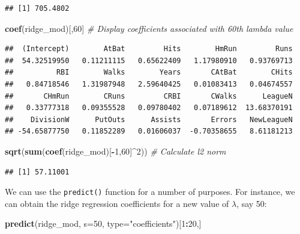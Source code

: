 \documentclass[openany]{book}
\newenvironment{Shaded}{\begin{snugshade}}{\end{snugshade}}
\newcommand{\CommentTok}[1]{\textcolor[rgb]{0.56,0.35,0.01}{\textit{#1}}}
\newcommand{\DataTypeTok}[1]{\textcolor[rgb]{0.13,0.29,0.53}{#1}}
\newcommand{\DecValTok}[1]{\textcolor[rgb]{0.00,0.00,0.81}{#1}}
\newcommand{\KeywordTok}[1]{\textcolor[rgb]{0.13,0.29,0.53}{\textbf{#1}}}
\newcommand{\NormalTok}[1]{#1}
\newcommand{\OperatorTok}[1]{\textcolor[rgb]{0.81,0.36,0.00}{\textbf{#1}}}
\newcommand{\StringTok}[1]{\textcolor[rgb]{0.31,0.60,0.02}{#1}}
\begin{document}
\begin{Shaded}
\end{Shaded}

\begin{verbatim}
## [1] 705.4802
\end{verbatim}

\begin{Shaded}
\begin{Highlighting}[]
\KeywordTok{coef}\NormalTok{(ridge_mod)[,}\DecValTok{60}\NormalTok{] }\CommentTok{# Display coefficients associated with 60th lambda value}
\end{Highlighting}
\end{Shaded}

\begin{verbatim}
##  (Intercept)        AtBat         Hits        HmRun         Runs 
##  54.32519950   0.11211115   0.65622409   1.17980910   0.93769713 
##          RBI        Walks        Years       CAtBat        CHits 
##   0.84718546   1.31987948   2.59640425   0.01083413   0.04674557 
##       CHmRun        CRuns         CRBI       CWalks      LeagueN 
##   0.33777318   0.09355528   0.09780402   0.07189612  13.68370191 
##    DivisionW      PutOuts      Assists       Errors   NewLeagueN 
## -54.65877750   0.11852289   0.01606037  -0.70358655   8.61181213
\end{verbatim}

\begin{Shaded}
\begin{Highlighting}[]
\KeywordTok{sqrt}\NormalTok{(}\KeywordTok{sum}\NormalTok{(}\KeywordTok{coef}\NormalTok{(ridge_mod)[}\OperatorTok{-}\DecValTok{1}\NormalTok{,}\DecValTok{60}\NormalTok{]}\OperatorTok{^}\DecValTok{2}\NormalTok{)) }\CommentTok{# Calculate l2 norm}
\end{Highlighting}
\end{Shaded}

\begin{verbatim}
## [1] 57.11001
\end{verbatim}

We can use the \texttt{predict()} function for a number of purposes. For instance,
we can obtain the ridge regression coefficients for a new value of \(\lambda\), say 50:

\begin{Shaded}
\begin{Highlighting}[]
\KeywordTok{predict}\NormalTok{(ridge_mod, }\DataTypeTok{s=}\DecValTok{50}\NormalTok{, }\DataTypeTok{type=}\StringTok{"coefficients"}\NormalTok{)[}\DecValTok{1}\OperatorTok{:}\DecValTok{20}\NormalTok{,]}
\end{Highlighting}
\end{Shaded}
\end{document}
